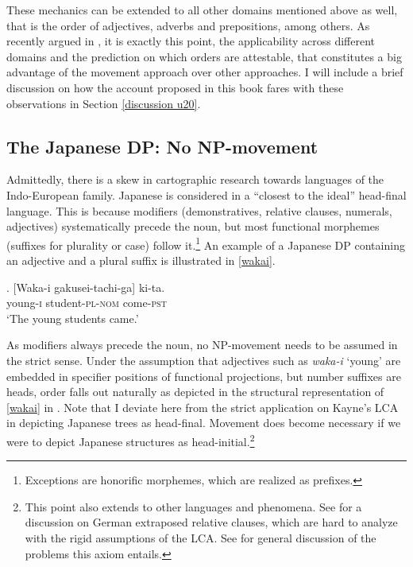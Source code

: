 These mechanics can be extended to all other domains mentioned above as well, that is the order of adjectives, adverbs and prepositions, among others. As recently argued in \citet{cinque:2025:superiority}, it is exactly this point, the applicability across different domains and the prediction on which orders are attestable, that constitutes a big advantage of the movement approach over other approaches. I will include a brief discussion on how the account proposed in this book fares with these observations in Section \ref{discussion u20}.

\subsection{The Japanese DP: No NP-movement} \label{japanese no movement}

Admittedly, there is a skew in cartographic research towards languages of the Indo-European family. Japanese is considered in \citet[3–4]{cinque:2017:micro} a ``closest to the ideal'' head-final language. This is because modifiers (demonstratives, relative clauses, numerals, adjectives) systematically precede the noun, but most functional morphemes (suffixes for plurality or case) follow it.\footnote{Exceptions are honorific morphemes, which are realized as prefixes.} An example of a Japanese DP containing an adjective and a plural suffix is illustrated in \ref{wakai}.

\exg. [Waka-i gakusei-tachi-ga] ki-ta.\\
young-\textsc{i} student-\textsc{pl-nom} come-\textsc{pst}\\
`The young students came.’ \label{wakai}

As modifiers always precede the noun, no NP-movement needs to be assumed in the strict sense. Under the assumption that adjectives such as \textit{waka-i} `young’ are embedded in specifier positions of functional projections, but number suffixes are heads, order falls out naturally as depicted in the structural representation of \ref{wakai} in . Note that I deviate here from the strict application on Kayne’s LCA in depicting Japanese trees as head-final. Movement does become necessary if we were to depict Japanese structures as head-initial.\footnote{This point also extends to other languages and phenomena. See \citet{buering:1997:doing} for a discussion on German extraposed relative clauses, which are hard to analyze with the rigid assumptions of the LCA. See \citet{abels:2012:.linear} for general discussion of the problems this axiom entails.} 

